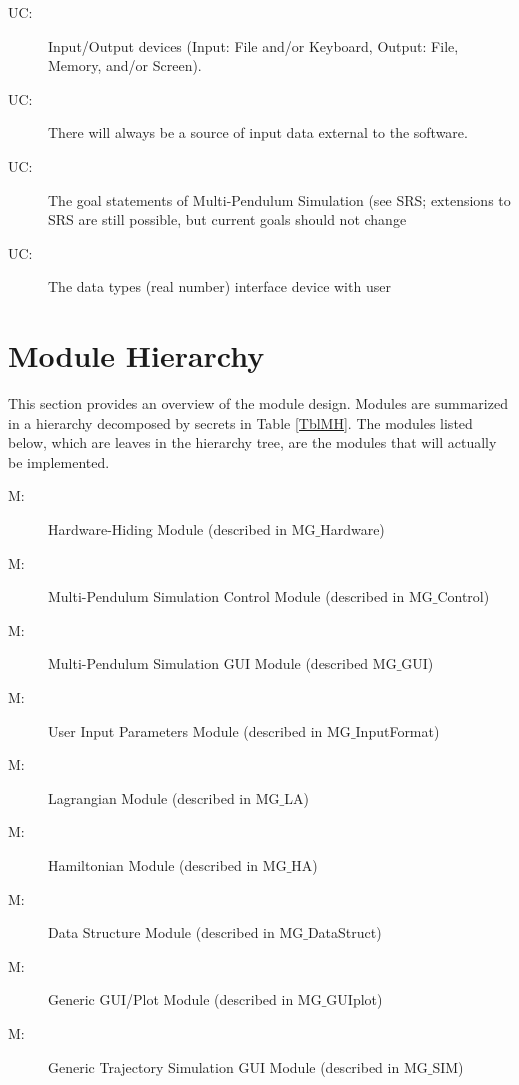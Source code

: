 \documentclass[12pt, titlepage]{article}
\newcounter{ucnum}
\newcommand{\uctheucnum}{UC\theucnum}
\newcounter{mnum}
\newcommand{\mthemnum}{M\themnum}
\newcommand{\progname}{Multi-Pendulum Simulation }
\begin{document}
\begin{description}
\item[ \uctheucnum \label{ucIO}:] Input/Output devices
  (Input: File and/or Keyboard, Output: File, Memory, and/or Screen).
\item[ \uctheucnum \label{ucInput}:] There will always be
  a source of input data external to the software. 
\item[ \uctheucnum \label{ucGoal}:] The goal statements of \progname
(see SRS; extensions to SRS are still possible, but current goals should not change
\item[ \uctheucnum \label{ucData}:] The data types (real number)
interface device with user 
\end{description}

\section{Module Hierarchy} \label{SecMH}

This section provides an overview of the module design. Modules are summarized
in a hierarchy decomposed by secrets in Table \ref{TblMH}. The modules listed
below, which are leaves in the hierarchy tree, are the modules that will
actually be implemented.

\begin{description}
\item [ \mthemnum \label{mHH}:] Hardware-Hiding Module (described in MG$\_$Hardware)
\item [ \mthemnum \label{mHH}:] \progname Control Module (described in MG$\_$Control)
\item [ \mthemnum \label{mHH}:] \progname GUI Module (described MG$\_$GUI)
\item [ \mthemnum \label{mHH}:] User Input Parameters Module (described in MG$\_$InputFormat)
\item [ \mthemnum \label{mHH}:] Lagrangian Module (described in MG$\_$LA)
\item [ \mthemnum \label{mHH}:] Hamiltonian Module (described in MG$\_$HA)
\item [ \mthemnum \label{mHH}:] Data Structure Module (described in MG$\_$DataStruct)
\item [ \mthemnum \label{mHH}:] Generic GUI/Plot Module (described in MG$\_$GUIplot)
\item [ \mthemnum \label{mHH}:] Generic Trajectory Simulation GUI Module (described in MG$\_$SIM)
\end{description}
\end{document}
